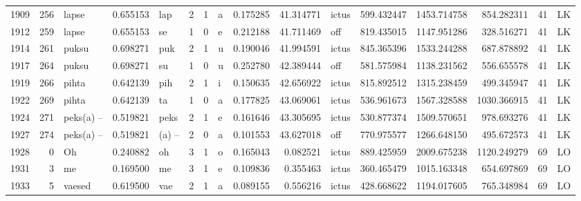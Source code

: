 \begin{tabular}{lrlrllllrrlrrrll}
1909 &         256 &            lapse &  0.655153 &     lap &        2 &      1 &       a &      0.175285 &     41.314771 &  ictus &   599.432447 &  1453.714758 &   854.282311 &     41 &        LK \\
1912 &         259 &            lapse &  0.655153 &      se &        1 &      0 &       e &      0.212188 &     41.711469 &    off &   819.435015 &  1147.951286 &   328.516271 &     41 &        LK \\
1914 &         261 &            puksu &  0.698271 &     puk &        2 &      1 &       u &      0.190046 &     41.994591 &  ictus &   845.365396 &  1533.244288 &   687.878892 &     41 &        LK \\
1917 &         264 &            puksu &  0.698271 &      su &        1 &      0 &       u &      0.252780 &     42.389444 &    off &   581.575984 &  1138.231562 &   556.655578 &     41 &        LK \\
1919 &         266 &            pihta &  0.642139 &     pih &        2 &      1 &       i &      0.150635 &     42.656922 &  ictus &   815.892512 &  1315.238459 &   499.345947 &     41 &        LK \\
1922 &         269 &            pihta &  0.642139 &      ta &        1 &      0 &       a &      0.177825 &     43.069061 &  ictus &   536.961673 &  1567.328588 &  1030.366915 &     41 &        LK \\
1924 &         271 &        peks(a) – &  0.519821 &    peks &        2 &      1 &       e &      0.161646 &     43.305695 &  ictus &   530.877374 &  1509.570651 &   978.693276 &     41 &        LK \\
1927 &         274 &        peks(a) – &  0.519821 &   (a) – &        2 &      0 &       a &      0.101553 &     43.627018 &    off &   770.975577 &  1266.648150 &   495.672573 &     41 &        LK \\
1928 &           0 &               Oh &  0.240882 &      oh &        3 &      1 &       o &      0.165043 &      0.082521 &  ictus &   889.425959 &  2009.675238 &  1120.249279 &     69 &        LO \\
1931 &           3 &               me &  0.169500 &      me &        3 &      1 &       e &      0.109836 &      0.355463 &  ictus &   360.465479 &  1015.163348 &   654.697869 &     69 &        LO \\
1933 &           5 &           vaesed &  0.619500 &     vae &        2 &      1 &       a &      0.089155 &      0.556216 &  ictus &   428.668622 &  1194.017605 &   765.348984 &     69 &        LO \\

\end{tabular}
